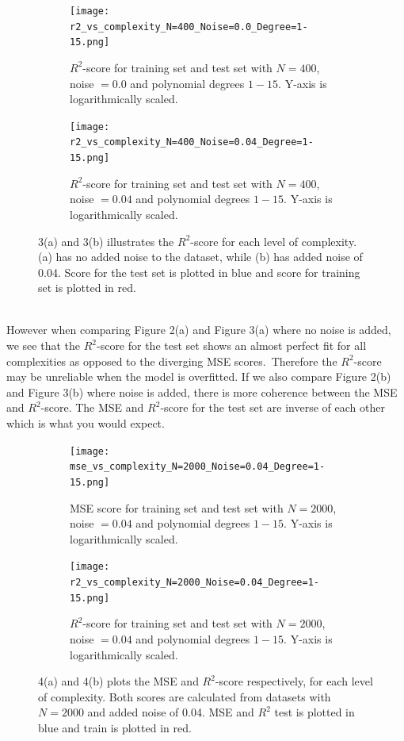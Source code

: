 \documentclass[a4paper,twocolumn]{article}
\begin{document}
\begin{figure}[ht]
    \centering
    \begin{subfigure}[b]{0.9\columnwidth}
        \texttt{[image: r2\_vs\_complexity\_N=400\_Noise=0.0\_Degree=1-15.png]}
        \caption{$R^{2}$-score for training set and test set with $N = 400$, noise $= 0.0$ and polynomial degrees $1-15$. Y-axis is logarithmically scaled.}
    \end{subfigure}
    
    \begin{subfigure}[b]{0.9\columnwidth}
        \texttt{[image: r2\_vs\_complexity\_N=400\_Noise=0.04\_Degree=1-15.png]}
        \caption{$R^{2}$-score for training set and test set with $N = 400$, noise $= 0.04$ and polynomial degrees $1-15$. Y-axis is logarithmically scaled.}
    \end{subfigure}
    \caption{3(a) and 3(b) illustrates the $R^{2}$-score for each level of complexity. (a) has no added noise to the dataset, while (b) has added noise of 0.04. Score for the test set is plotted in blue and score for training set is plotted in red.}
\end{figure}\\
\noindent However when comparing Figure 2(a) and Figure 3(a) where no noise is added, we see that the $R^{2}$-score for the test set shows an almost perfect fit for all complexities as opposed to the diverging MSE scores.\ Therefore the $R^{2}$-score may be unreliable when the model is overfitted. If we also compare Figure 2(b) and Figure 3(b) where noise is added, there is more coherence between the MSE and $R^{2}$-score. The MSE and  $R^{2}$-score for the test set are inverse of each other which is what you would expect.
\begin{figure}[ht]
    \centering
    \begin{subfigure}[b]{0.9\columnwidth}
        \texttt{[image: mse\_vs\_complexity\_N=2000\_Noise=0.04\_Degree=1-15.png]}
        \caption{MSE score for training set and test set with $N = 2000$, noise $= 0.04$ and polynomial degrees $1-15$. Y-axis is logarithmically scaled.}
    \end{subfigure}
    
    \begin{subfigure}[b]{0.9\columnwidth}
        \texttt{[image: r2\_vs\_complexity\_N=2000\_Noise=0.04\_Degree=1-15.png]}
        \caption{$R^{2}$-score for training set and test set with $N = 2000$, noise $= 0.04$ and polynomial degrees $1-15$. Y-axis is logarithmically scaled.}
    \end{subfigure}
    \caption{4(a) and 4(b) plots the MSE and $R^{2}$-score respectively, for each level of complexity. Both scores are calculated from datasets with $N= 2000$ and added noise of 0.04. MSE and $R^{2}$ test is plotted in blue and train is plotted in red.}
\end{figure}\\
\end{document}
